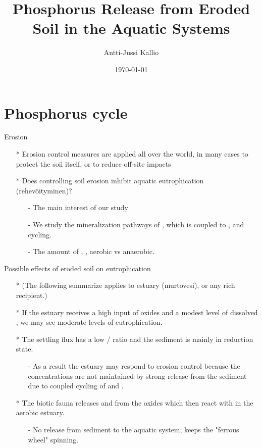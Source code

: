 \documentclass{beamer}
\title{Phosphorus Release from Eroded Soil in the Aquatic Systems}
\date{\today}
\author{Antti-Jussi Kallio}
\institute{University of Helsinki}
\begin{document}
  \maketitle
  \section{Phosphorus cycle}
  \begin{frame}{Erosion}
    \begin{itemize}
    \item[*] Erosion control measures are applied all over the world, in many cases to protect the soil itself, or to reduce off-site impacts  
    \item[*] Does controlling soil erosion inhibit aquatic eutrophication (rehev{\"o}ityminen)?
      \begin{itemize}
        \item[-] The main interest of our study
        \item[-] We study the mineralization pathways of , which is coupled to ,  and  cycling.
        \item[-] The amount of , , aerobic vs anaerobic.
      \end{itemize}
    \end{itemize}
  \end{frame}
  \begin{frame}{Possible effects of eroded soil on eutrophication}
    \begin{itemize}
      \item[*] \small{(The following summarize applies to estuary (murtovesi), or any  rich recipient.)}
      \item[*] If the estuary receives a high input of  oxides and a modest level of dissolved , we may see 		  moderate levels of eutrophication.
      \item[*] The settling flux has a low / ratio and the sediment is mainly in  reduction state.
      \begin{itemize}
        \item[-] As a result the estuary may respond to erosion control because the  concentrations are not maintained by strong  release from the sediment due to coupled cycling of  and . 
	  \end{itemize}
	  \item[*] The biotic fauna releases  and  from the oxides which then react with  in the aerobic estuary.
	  \begin{itemize}
		\item[-] No  release from sediment to the aquatic system, keeps the "ferrous wheel" spinning.	
	  \end{itemize}	        
    \end{itemize}
  \end{frame}
  
\end{document}
